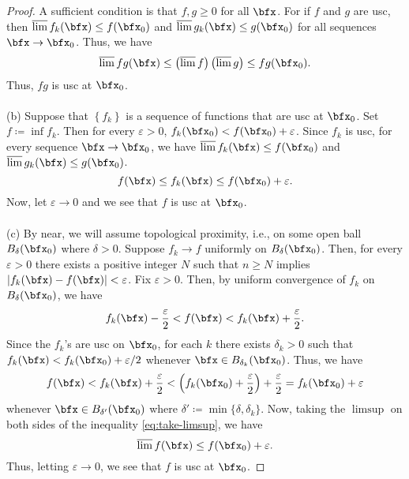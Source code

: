 \begin{proof}
A sufficient condition is that $f,g\geq 0$ for all $\bfx$. For if $f$ and
$g$ are usc, then $\varlimsup f_k(\bfx)\leq f(\bfx_0)$ and $\varlimsup
g_k(\bfx)\leq g(\bfx_0)$ for all sequences $\bfx\to\bfx_0$. Thus, we have
\[
\varlimsup fg(\bfx)\leq
\left(\varlimsup f\right)
\left(\varlimsup g\right)\leq
fg(\bfx_0).
\]
Thus, $fg$ is usc at $\bfx_0$.
\\\\
(b) Suppose that $\left\{f_k\right\}$ is a sequence of functions that are
usc at $\bfx_0$. Set $f\coloneqq\inf f_k$. Then for every $\varepsilon>0$,
$f_k(\bfx_0)<f(\bfx_0)+\varepsilon$. Since $f_k$ is usc, for every sequence
$\bfx\to\bfx_0$, we have $\varlimsup f_k(\bfx)\leq f(\bfx_0)$ and $\varlimsup
g_k(\bfx)\leq g(\bfx_0)$.
\begin{equation}
  \label{eq:infimum-estimate}
f(\bfx)\leq f_k(\bfx)\leq f(\bfx_0)+\varepsilon.
\end{equation}
Now, let $\varepsilon\to 0$ and we see that $f$ is usc at $\bfx_0$.
\\\\
(c) By near, we will assume topological proximity, i.e., on some open ball
$B_\delta(\bfx_0)$ where $\delta>0$. Suppose $f_k\to f$ uniformly on
$B_\delta(\bfx_0)$. Then, for every $\varepsilon>0$ there exists a positive
integer $N$ such that $n\geq N$ implies
$\left|f_k(\bfx)-f(\bfx)\right|<\varepsilon$. Fix $\varepsilon>0$. Then, by
uniform convergence of $f_k$ on $B_\delta(\bfx_0)$, we have
\begin{equation}
  \label{eq:uniform-convergence-estimate}
f_k(\bfx)-\frac{\varepsilon}{2}<f(\bfx)<f_k(\bfx)+\frac{\varepsilon}{2}.
\end{equation}
Since the $f_k$'s are usc on $\bfx_0$, for each $k$ there exists
$\delta_k>0$ such that $f_k(\bfx)<f_k(\bfx_0)+\varepsilon/2$ whenever
$\bfx\in B_{\delta_k}(\bfx_0)$. Thus, we have
\begin{equation}
\label{eq:take-limsup}
f(\bfx)<
f_k(\bfx)+\frac{\varepsilon}{2}<
\left(f_k(\bfx_0)+\frac{\varepsilon}{2}\right)+\frac{\varepsilon}{2}=
f_k(\bfx_0)+\varepsilon
\end{equation}
whenever $\bfx\in B_{\delta'}(\bfx_0)$ where
$\delta'\coloneqq\min\{\delta,\delta_k\}$. Now, taking the $\limsup$ on
both sides of the inequality \eqref{eq:take-limsup}, we have
\[
\varlimsup f(\bfx)\leq f(\bfx_0)+\varepsilon.
\]
Thus, letting $\varepsilon\to 0$, we see that $f$ is usc at
$\bfx_0$.
\end{proof}

